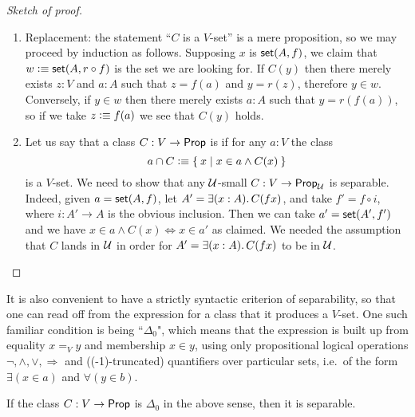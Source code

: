 \begin{proof}[Sketch of proof]
\begin{enumerate}
  \item Replacement: the statement ``$C$ is a $V$-set'' is a mere proposition, so we may
    proceed by induction as follows. Supposing $x$ is $\mathsf{set}(A, f)$, we claim that $w
    \vcentcolon\equiv \mathsf{set}(A, r \circ f)$ is the set we are looking for.  If $C(y)$ then there merely exists
    $z : V$ and $a : A$ such that $z = f(a)$ and $y = r(z)$, therefore $y \in w$.
    Conversely, if $y \in w$ then there merely exists $a : A$ such that $y = r(f(a))$, so
    if we take $z \vcentcolon\equiv f(a)$ we see that $C(y)$ holds.

\item Let us say that a class $C: V\to\mathsf{Prop}$ is  if for any $a:V$ the class $$a\cap C \vcentcolon\equiv\Set{x | x\in a \wedge C(x)}$$ is a $V$-set.
We need to show that any $\mathcal{U}$-small  $C: V \to \mathsf{Prop}_\mathcal{U}$ is separable. Indeed, given $a=\mathsf{set}(A,f)$, let $A' = \exis{x:A}C(fx)$, and take $f' = f\circ i$, where $i : A' \to A$ is the obvious inclusion.  Then we can take $a' = \mathsf{set}(A',f')$ and we have $x\in a\wedge C(x) \Leftrightarrow x\in a'$ as claimed.  We needed the assumption that $C$ lands in $\mathcal{U}$ in order for $A' = \exis{x:A}C(fx)$ to be in $\mathcal{U}$.
\end{enumerate}
\end{proof}

It is also convenient to have a strictly syntactic criterion of separability, so that one can read off from the expression for a class that it produces a $V$-set.  One such familiar condition is being ``$\Delta_0$", which means that the expression is built up from equality $x=_V y$ and membership $x\in y$, using only propositional logical operations $\neg, \land, \lor, \Rightarrow$ and ((-1)-truncated) quantifiers over particular sets, i.e.\ of the form $\exists(x\in a)$ and $\forall(y\in b)$.  

\begin{cor}\label{cor:Delta0sep}
If the class $C: V \to \mathsf{Prop}$ is $\Delta_0$ in the above sense, then it is separable.
\end{cor}

